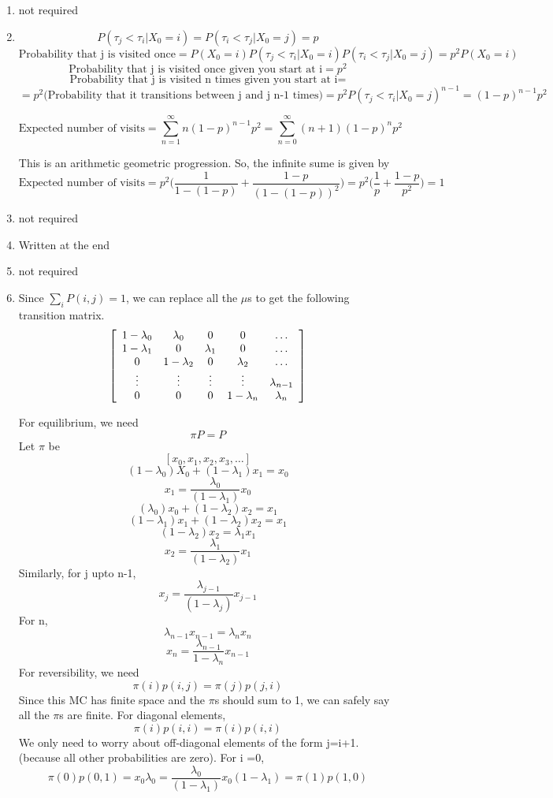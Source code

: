 \documentclass[a4paper,11pt]{article}
\newenvironment{mat}{\left[ \begin{array}{ccccccccccccc}}{\end{array}\right]}
\newcommand\bcm{\begin{mat}}
\newcommand\ecm{\end{mat}}
\begin{document}
\begin{enumerate}
\begin{enumerate}
\end{enumerate}
\item not required
\item 
\[P(\tau_j < \tau_i|X_0 = i)=P(\tau_i < \tau_j|X_0 = j) =p\]
\[\text{Probability that j is visited once}= P(X_0=i)P(\tau_j < \tau_i|X_0 = i) P(\tau_i < \tau_j|X_0 = j) =p^2P(X_0=i)\]
\vspace{10mm}
\[\text{Probability that j is visited once given you start at i} =p^2\]
\vspace{10mm}
\[\text{Probability that j is visited n times given you start at i} =\]
\[ =p^2\text{(Probability that it transitions between j and j n-1 times)} = p^2 P(\tau_j < \tau_i|X_0 = j)^{n-1}= (1-p)^{n-1}p^2\]

\[\text{Expected number of visits} = \sum_{n=1}^{\infty} n (1-p)^{n-1}p^2  = \sum_{n=0}^{\infty} (n+1) (1-p)^{n}p^2  \]

This is an arithmetic geometric progression. So, the infinite sume is given by
\[\text{Expected number of visits} = p^2 \bigg(\frac{1}{1-(1-p)} +\frac{1-p}{(1-(1-p))^2} \bigg) = p^2 \bigg(\frac{1}{p} +\frac{1-p}{p^2} \bigg) =1\]

\item not required
\item Written at the end
\item not required
\item
Since $\sum_i P(i,j) = 1$, we can replace all the $\mu$s to get the following transition matrix.
 \[ \bcm  1-\lambda_0 & \lambda_0  &0  &0  &\hdots \\ 1-\lambda_1 & 0  &\lambda_1 &0 &\hdots\\ 0 & 1-\lambda_2  &0 &\lambda_2 &\hdots  \\ \vdots &\vdots  &\vdots  &\vdots &\lambda_{n-1} \\ 0 &0  &0 &1-\lambda_n &\lambda_n     \ecm\]


For equilibrium, we need
\[\pi P = P\]
Let $\pi$ be
\[ [x_0, x_1, x_2,x_3 ,\ldots]\]
\[(1-\lambda_0)X_0 + (1-\lambda_1)x_1=x_0\]
\[x_1 = \frac{\lambda_0}{(1-\lambda_1)}x_0\]
\[(\lambda_0)x _0 + (1-\lambda_2)x_2=x_1\]
\[(1-\lambda_1)x_1 + (1-\lambda_2)x_2=x_1\]
\[(1-\lambda_2)x_2=\lambda_1 x_1\]
\[x_2 = \frac{\lambda_1}{(1-\lambda_2)}x_1\]
Similarly, for j upto n-1,
\[x_{j} = \frac{\lambda_{j-1}}{(1-\lambda_j)}x_{j-1}\]
For n,
\[\lambda_{n-1}x_{n-1}=\lambda_{n}x_{n}\]
\[x_{n} = \frac{\lambda_{n-1}}{1-\lambda_n}x_{n-1}\]
For reversibility, we need
\[\pi(i) p(i,j) = \pi(j)p(j,i)\]
Since this MC has finite space and the $\pi$s should sum to 1, we can safely say all the $\pi$s are finite.
For diagonal elements,
\[\pi(i) p(i,i) = \pi(i)p(i,i)\]
We only need to worry about off-diagonal elements of the form j=i+1. (because all other probabilities are zero).
For i =0,
\[\pi(0)p(0,1)=x_0 \lambda_0= \frac{\lambda_0}{(1-\lambda_1)}x_0(1-\lambda_1)=\pi(1)p(1,0)\]


\end{enumerate}
\end{document}
